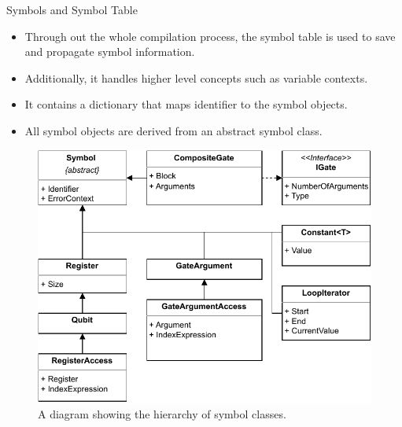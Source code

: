 \begin{frame}{Symbols and Symbol Table}
    \begin{minipage}{.45\textwidth}
        \begin{itemize}
            \item Through out the whole compilation process, the symbol table is used to save and propagate symbol information.
            \item Additionally, it handles higher level concepts such as variable contexts.
            \item It contains a dictionary that maps identifier to the symbol objects.
            \item All symbol objects are derived from an abstract symbol class.
        \end{itemize}    
    \end{minipage}
    \begin{minipage}{.50\textwidth}
        \centering
        \begin{figure}[htp]
            \centering
            \includegraphics[]{../figures/drawio/slides/uml_symbols.pdf}
            \caption{A diagram showing the hierarchy of symbol classes.}
        \end{figure}
    \end{minipage}
\end{frame}


